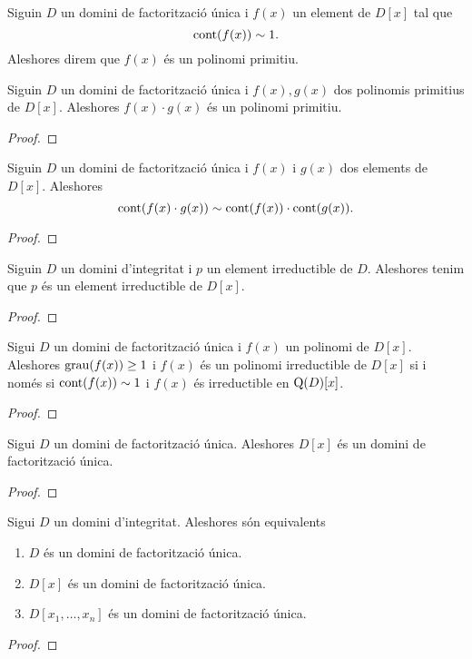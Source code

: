 \documentclass[../Apunts.tex]{subfiles}
\begin{document}
	\begin{definition}
		Siguin \(D\) un domini de factorització única i \(f(x)\) un element de \(D[x]\) tal que
		\[\operatorname{cont}(f(x))\sim1.\]
		Aleshores direm que \(f(x)\) és un polinomi primitiu.
	\end{definition}
	\begin{lemma}
		\label{lema:lema de Gauss}
		Siguin \(D\) un domini de factorització única i \(f(x),g(x)\) dos polinomis primitius de \(D[x]\). Aleshores \(f(x)\cdot g(x)\) és un polinomi primitiu.
		\begin{proof}
		\end{proof}
	\end{lemma}
	\begin{corollary}
		Siguin \(D\) un domini de factorització única i \(f(x)\) i \(g(x)\) dos elements de \(D[x]\). Aleshores
		\[\operatorname{cont}(f(x)\cdot g(x))\sim\operatorname{cont}(f(x))\cdot\operatorname{cont}(g(x)).\]
		\begin{proof}
		\end{proof}
	\end{corollary}
	\begin{lemma}
		Siguin \(D\) un domini d'integritat i \(p\) un element irreductible de \(D\). Aleshores tenim que \(p\) és un element irreductible de \(D[x]\).
		\begin{proof}
		\end{proof}
	\end{lemma}
	\begin{theorem}
		Sigui \(D\) un domini de factorització única i \(f(x)\) un polinomi de \(D[x]\). Aleshores \(\operatorname{grau}(f(x))\geq1\) i \(f(x)\) és un polinomi irreductible de \(D[x]\) si i només si \(\operatorname{cont}(f(x))\sim1\) i \(f(x)\) és irreductible en \(\operatorname{Q}(D)[x]\).
		\begin{proof}
		\end{proof}
	\end{theorem}
	\begin{theorem}
		Sigui \(D\) un domini de factorització única. Aleshores \(D[x]\) és un domini de factorització única.
		\begin{proof}
		\end{proof}
	\end{theorem}
	\begin{theorem}
		Sigui \(D\) un domini d'integritat. Aleshores són equivalents
		\begin{enumerate}
			\item \(D\) és un domini de factorització única.
			\item \(D[x]\) és un domini de factorització única.
			\item \(D[x_{1},\dots,x_{n}]\) és un domini de factorització única.
		\end{enumerate}
		\begin{proof}
		\end{proof}
	\end{theorem}
\end{document}
